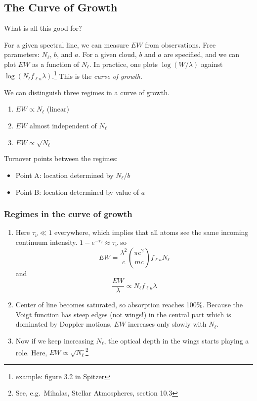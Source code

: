 \documentclass[12pt]{article}
\newcommand{\mar}[1]{\hspace{0pt}\marginpar{-\textcolor{black}{#1}-}}
\begin{document}
\subsection{The Curve of Growth}
What is all this good for?

For a given spectral line, we can measure $EW$ from observations.
Free parameters: $N_{\ell}$, $b$, and $a$. For a given cloud, $b$
and $a$ are specified, and we can plot $EW$ as a function of $N_{\ell}$.
In practice, one plots $\log(W/\lambda) $ against
$\log ( N_{\ell}f_{\ell{u}}\lambda ) $.\footnote{
    example: figure 3.2 in Spitzer}
This is the \textit{curve of growth}.

We can distinguish three regimes in a curve of growth.
\begin{enumerate}[label={\Roman*}.]
    \item \mar{93}$EW \propto N_{\ell}$ (linear)
    \item $EW$ almost independent of $N_{\ell}$
    \item $EW \propto \sqrt{N_{\ell}}$
\end{enumerate}
Turnover points between the regimes:
\begin{itemize}
    \item Point A: location determined by $N_{\ell}/b$
    \item Point B: location determined by value of $a$
\end{itemize}

\subsubsection{Regimes in the curve of growth}
\begin{enumerate}[label={\Roman*}.]
    \item Here $\tau_{\nu} \ll 1$ everywhere, which implies that all atoms
        see the same incoming continuum intensity.
        $ 1 - e^{-\tau_{\nu}} \approx \tau_{\nu} $ so
        \[
            EW = \frac{\lambda^{2}}{c} \left( \frac{{\pi}e^{2}}{mc} \right)
            f_{{\ell}u} N_{\ell}
            \]
        and
        \[
            \frac{EW}{\lambda} \propto N_{\ell} f_{{\ell}u} \lambda
            \]
    \item Center of line becomes saturated, so absorption reaches 100\%.
        Because the Voigt function has steep edges (not wings!) in the
        central part which is dominated by Doppler motions, $EW$ increases
        only slowly with $N_{\ell}$.
    \item Now if we keep increasing $N_{\ell}$, the optical depth in the wings
        starts playing a role. Here, $EW \propto \sqrt{N_{\ell}}$\footnote{
            See, e.g.\ Mihalas, Stellar Atmospheres, section 10.3}
\end{enumerate}
\end{document}
